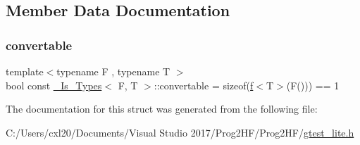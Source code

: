 \subsection{Member Data Documentation}
\mbox{\label{struct___is___types_aef853f15f013611d0890cb6fc408ae47}} 
\subsubsection{\texorpdfstring{convertable}{convertable}}
{\footnotesize\ttfamily template$<$typename F , typename T $>$ \\
bool const \mbox{\hyperlink{struct___is___types}{\+\_\+\+Is\+\_\+\+Types}}$<$ F, T $>$\+::convertable = sizeof(\mbox{\hyperlink{struct___is___types_a1bd22cb90b9438997283201839aec09f}{f}}$<$T$>$(F())) == 1\hspace{0.3cm}{\ttfamily [static]}}



The documentation for this struct was generated from the following file\+:\begin{DoxyCompactItemize}
\item 
C\+:/\+Users/cxl20/\+Documents/\+Visual Studio 2017/\+Prog2\+H\+F/\+Prog2\+H\+F/\mbox{\hyperlink{gtest__lite_8h}{gtest\+\_\+lite.\+h}}\end{DoxyCompactItemize}

